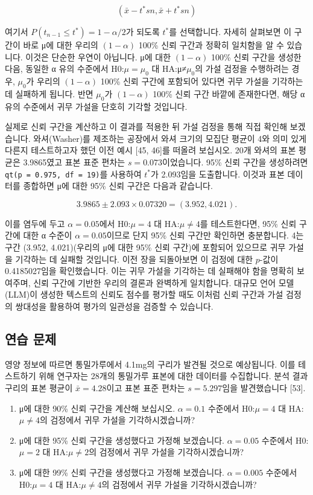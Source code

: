 \documentclass[
]{scrbook}
\providecommand{\tightlist}{%
  \setlength{\itemsep}{0pt}\setlength{\parskip}{0pt}}
\begin{document}
\[
(\bar{x}-t^*sn,\bar{x}+t^*sn)
\]

여기서 \(P(t_{n-1} \le t^*) = 1-\alpha/2\)가 되도록 \(t^*\)를
선택합니다. 자세히 살펴보면 이 구간이 바로 μ에 대한 우리의
\((1-\alpha)\) 100\% 신뢰 구간과 정확히 일치함을 알 수 있습니다. 이것은
단순한 우연이 아닙니다. μ에 대한 \((1-\alpha)\) 100\% 신뢰 구간을 생성한
다음, 동일한 α 유의 수준에서 H0:\(\mu=\mu_0\) 대 HA:μ≠\(\mu_0\)의 가설
검정을 수행하려는 경우, \(\mu_0\)가 우리의 \((1-\alpha)\) 100\% 신뢰
구간에 포함되어 있다면 귀무 가설을 기각하는 데 실패하게 됩니다. 반면
\(\mu_0\)가 \((1-\alpha)\) 100\% 신뢰 구간 바깥에 존재한다면, 해당 α
유의 수준에서 귀무 가설을 단호히 기각할 것입니다.

실제로 신뢰 구간을 계산하고 이 결과를 적용한 뒤 가설 검정을 통해 직접
확인해 보겠습니다. 와셔(Washer)를 제조하는 공장에서 와셔 크기의 모집단
평균이 4와 의미 있게 다른지 테스트하고자 했던 이전 예시 {[}45, 46{]}를
떠올려 보십시오. 20개 와셔의 표본 평균은 3.9865였고 표본 표준 편차는
\(s=0.073\)이었습니다. 95\% 신뢰 구간을 생성하려면
\texttt{qt(p\ =\ 0.975,\ df\ =\ 19)}를 사용하여 \(t^*\)가 2.093임을
도출합니다. 이것과 표본 데이터를 종합하면 μ에 대한 95\% 신뢰 구간은
다음과 같습니다.

\[
3.9865±2.093×0.07320=(3.952,4.021).
\]

이를 염두에 두고 \(\alpha=0.05\)에서 H0:\(\mu=4\) 대 HA:\(\mu \neq 4\)를
테스트한다면, 95\% 신뢰 구간에 대한 α 수준이 \(\alpha=0.05\)이므로 단지
95\% 신뢰 구간만 확인하면 충분합니다. 4는 구간 (3.952, 4.021)(우리의 μ에
대한 95\% 신뢰 구간)에 포함되어 있으므로 귀무 가설을 기각하는 데 실패할
것입니다. 이전 장을 되돌아보면 이 검정에 대한 \(p\)-값이 0.4185027임을
확인했습니다. 이는 귀무 가설을 기각하는 데 실패해야 함을 명확히
보여주며, 신뢰 구간에 기반한 우리의 결론과 완벽하게 일치합니다. 대규모
언어 모델(LLM)이 생성한 텍스트의 신뢰도 점수를 평가할 때도 이처럼 신뢰
구간과 가설 검정의 쌍대성을 활용하여 평가의 일관성을 검증할 수 있습니다.

\subsection{연습 문제}\label{uxc5f0uxc2b5-uxbb38uxc81c-3}

영양 정보에 따르면 통밀가루에서 4.1mg의 구리가 발견될 것으로 예상됩니다.
이를 테스트하기 위해 연구자는 28개의 통밀가루 표본에 대한 데이터를
수집합니다. 분석 결과 구리의 표본 평균이 \(\bar{x}=4.28\)이고 표본 표준
편차는 \(s=5.297\)임을 발견했습니다 {[}53{]}.

\begin{enumerate}
\def\labelenumi{\arabic{enumi}.}
\setcounter{enumi}{9}
\tightlist
\item
  μ에 대한 90\% 신뢰 구간을 계산해 보십시오. \(\alpha=0.1\) 수준에서
  H0:\(\mu=4\) 대 HA:\(\mu \neq 4\)의 검정에서 귀무 가설을
  기각하시겠습니까?
\item
  μ에 대한 95\% 신뢰 구간을 생성했다고 가정해 보겠습니다.
  \(\alpha=0.05\) 수준에서 H0:\(\mu=2\) 대 HA:\(\mu \neq 2\)의 검정에서
  귀무 가설을 기각하시겠습니까?
\item
  μ에 대한 99\% 신뢰 구간을 생성했다고 가정해 보겠습니다.
  \(\alpha=0.005\) 수준에서 H0:\(\mu=4\) 대 HA:\(\mu \neq 4\)의 검정에서
  귀무 가설을 기각하시겠습니까?
\end{enumerate}
\end{document}
